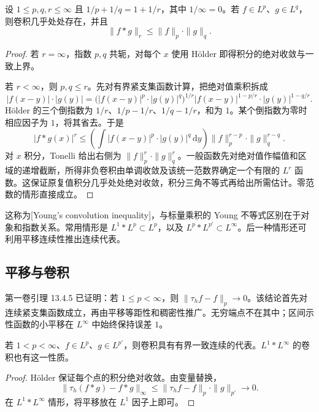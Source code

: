\begin{theorem}\label{b2:thm:03-young}
设 \(1\leq p,q,r\leq\infty\) 且 \(1/p+1/q=1+1/r\)，其中 \(1/\infty=0\)。若 \(f\in L^p\)、\(g\in L^q\)，则卷积几乎处处存在，并且
\[
 \|f*g\|_r\leq\|f\|_p\cdot\|g\|_q.
\]
\end{theorem}
\begin{proof}
若 \(r=\infty\)，指数 \(p,q\) 共轭，对每个 \(x\) 使用 Hölder 即得积分的绝对收敛与一致上界。

若 \(r<\infty\)，则 \(p,q\leq r\)。先对有界紧支集函数计算，把绝对值乘积拆成
\[
 |f(x-y)|\cdot|g(y)|
 =\bigl(|f(x-y)|^p\cdot|g(y)|^q\bigr)^{1/r}
    |f(x-y)|^{1-p/r}\cdot|g(y)|^{1-q/r}.
\]
Hölder 的三个倒指数为 \(1/r\)、\(1/p-1/r\)、\(1/q-1/r\)，和为 \(1\)。某个倒指数为零时相应因子为 \(1\)，将其省去。于是
\[
 |f*g(x)|^r
 \leq\left(\int |f(x-y)|^p\cdot|g(y)|^q\,\mathrm{d}y\right)
       \|f\|_p^{r-p}\cdot\|g\|_q^{r-q}.
\]
对 \(x\) 积分，Tonelli 给出右侧为 \(\|f\|_p^r\cdot\|g\|_q^r\)。一般函数先对绝对值作幅值和区域的递增截断，所得非负卷积由单调收敛及该统一范数界确定一个有限的 \(L^r\) 函数。这保证原复值积分几乎处处绝对收敛，积分三角不等式再给出所需估计。零范数的情形直接成立。
\end{proof}

这称为[Young's convolution inequality]，与标量乘积的 Young 不等式区别在于对象和指数关系。常用情形是 \(L^1*L^p\subset L^p\)，以及 \(L^p*L^{p'}\subset L^\infty\)。后一种情形还可利用平移连续性推出连续代表。

\subsection{平移与卷积}
\label{b2:subsec:030303}

第一卷引理 13.4.5 已证明：若 \(1\leq p<\infty\)，则 \(\|\tau_hf-f\|_p\to0\)。该结论首先对连续紧支集函数成立，再由平移等距性和稠密性推广。无穷端点不在其中；区间示性函数的小平移在 \(L^\infty\) 中始终保持误差 \(1\)。

\begin{proposition}\label{b2:prop:03-convolution-continuity}
若 \(1<p<\infty\)、\(f\in L^p\)、\(g\in L^{p'}\)，则卷积具有有界一致连续的代表。\(L^1*L^\infty\) 的卷积也有这一性质。
\end{proposition}
\begin{proof}
Hölder 保证每个点的积分绝对收敛。由变量替换，
\[
 \|\tau_h(f*g)-f*g\|_\infty
 \leq\|\tau_hf-f\|_p\cdot\|g\|_{p'}\longrightarrow0.
\]
在 \(L^1*L^\infty\) 情形，将平移放在 \(L^1\) 因子上即可。
\end{proof}

